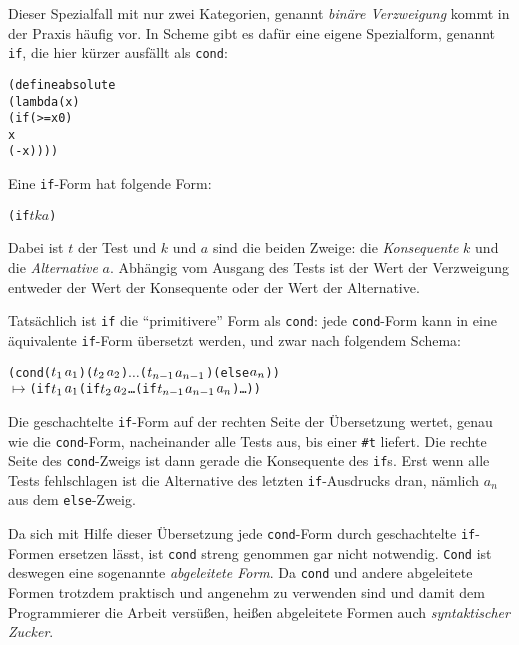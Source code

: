 %
Dieser Spezialfall mit nur zwei Kategorien, genannt \textit{binäre
  Verzweigung} kommt in der Praxis
häufig vor.  In Scheme gibt es dafür eine eigene Spezialform,
genannt \texttt{if}, die hier kürzer ausfällt
als \texttt{cond}:
%
\begin{alltt}
(define absolute
  (lambda (x)
    (if (>= x 0)
        x
        (- x))))
\end{alltt}
%
Eine \texttt{if}-Form hat folgende Form:
%
\begin{alltt}
(if \(t\) \(k\) \(a\))
\end{alltt}
Dabei ist $t$ der Test und $k$ und $a$ sind die
beiden Zweige: die \textit{Konsequente} $k$ und die
\textit{Alternative} $a$.  Abhängig vom Ausgang des
Tests ist der Wert der Verzweigung entweder der Wert der Konsequente
oder der Wert der Alternative.

Tatsächlich ist \texttt{if} die "`primitivere"' Form als
\texttt{cond}: jede \texttt{cond}-Form kann in eine äquivalente
\texttt{if}-Form übersetzt werden, und zwar nach
folgendem Schema:
%
\begin{alltt}
(cond (\(t\sb{1}\) \(a\sb{1}\)) (\(t\sb{2}\) \(a\sb{2}\)) \(\ldots\) (\(t\sb{n-1}\) \(a\sb{n-1}\)) (else \(a\sb{n}\)))
  \(\mapsto\) (if \(t\sb{1}\) \(a\sb{1}\) (if \(t\sb{2}\) \(a\sb{2}\) \ldots (if \(t\sb{n-1}\) \(a\sb{n-1}\) \(a\sb{n}\))\ldots))
\end{alltt}
%
Die geschachtelte \texttt{if}-Form auf der rechten Seite der
Übersetzung wertet, genau wie die \texttt{cond}-Form, nacheinander
alle Tests aus, bis einer \verb|#t| liefert.  Die rechte Seite des
\texttt{cond}-Zweigs ist dann gerade die Konsequente des \texttt{if}s.
Erst wenn alle Tests fehlschlagen ist die Alternative des letzten
\texttt{if}-Ausdrucks dran, nämlich $a_n$ aus dem \texttt{else}-Zweig.

Da sich mit Hilfe dieser Übersetzung jede \texttt{cond}-Form durch
geschachtelte \texttt{if}-Formen ersetzen lässt, ist \texttt{cond}
streng genommen gar nicht notwendig.  \texttt{Cond} ist deswegen eine
sogenannte \textit{abgeleitete Form}.  Da \texttt{cond} und andere
abgeleitete Formen trotzdem praktisch und angenehm zu verwenden sind
und damit dem Programmierer die Arbeit versüßen,
heißen abgeleitete Formen auch \textit{syntaktischer
  Zucker}.

